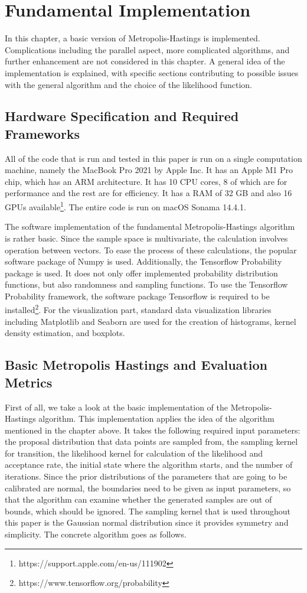 \chapter{Fundamental Implementation}
In this chapter, a basic version of Metropolis-Hastings is implemented. Complications including the parallel aspect, more complicated algorithms, and further enhancement are not considered in this chapter. A general idea of the implementation is explained, with specific sections contributing to possible issues with the general algorithm and the choice of the likelihood function.

\section{Hardware Specification and Required Frameworks}
All of the code that is run and tested in this paper is run on a single computation machine, namely the MacBook Pro 2021 by Apple Inc. It has an Apple M1 Pro chip, which has an ARM architecture. It has 10 CPU cores, 8 of which are for performance and the rest are for efficiency. It has a RAM of 32 GB and also 16 GPUs available\footnote{https://support.apple.com/en-us/111902}. The entire code is run on macOS Sonama 14.4.1.

The software implementation of the fundamental Metropolis-Hastings algorithm is rather basic. Since the sample space is multivariate, the calculation involves operation between vectors. To ease the process of these calculations, the popular software package of Numpy is used.\cite{numpy} Additionally, the Tensorflow Probability package is used. It does not only offer implemented probability distribution functions, but also randomness and sampling functions.\cite{tfp} To use the Tensorflow Probability framework, the software package Tensorflow is required to be installed\footnote{https://www.tensorflow.org/probability}. For the visualization part, standard data visualization libraries including Matplotlib and Seaborn are used for the creation of histograms, kernel density estimation, and boxplots.\cite{plt}

\section{Basic Metropolis Hastings and Evaluation Metrics}
First of all, we take a look at the basic implementation of the Metropolis-Hastings algorithm. This implementation applies the idea of the algorithm mentioned in the chapter above. It takes the following required input parameters: the proposal distribution that data points are sampled from, the sampling kernel for transition, the likelihood kernel for calculation of the likelihood and acceptance rate, the initial state where the algorithm starts, and the number of iterations. Since the prior distributions of the parameters that are going to be calibrated are normal, the boundaries need to be given as input parameters, so that the algorithm can examine whether the generated samples are out of bounds, which should be ignored. The sampling kernel that is used throughout this paper is the Gaussian normal distribution since it provides symmetry and simplicity.\cite{gaussian_distribution_property} The concrete algorithm goes as follows.

